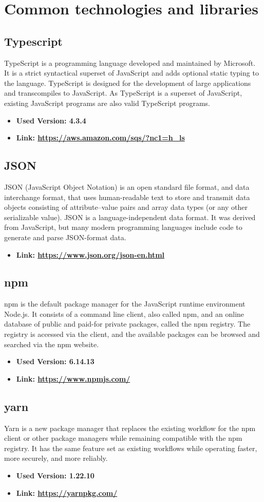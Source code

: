 \section{Common technologies and libraries}
\subsection{Typescript}
TypeScript is a programming language developed and maintained by Microsoft. It is a strict syntactical
superset of JavaScript and adds optional static typing to the language. TypeScript is designed for the
development of large applications and transcompiles to JavaScript. As TypeScript is a superset of JavaScript,
existing JavaScript programs are also valid TypeScript programs.
\begin{itemize}
  \item \textbf{Used Version: 4.3.4}
  \item \textbf{Link: \url{https://aws.amazon.com/sqs/?nc1=h_ls}}
\end{itemize}
\subsection{JSON}
JSON (JavaScript Object Notation) is an open standard file format, and data interchange format, that
uses human-readable text to store and transmit data objects consisting of attribute–value pairs and
array data types (or any other serializable value).
JSON is a language-independent data format. It was derived from JavaScript,
but many modern programming languages include code to generate and parse JSON-format data.
\begin{itemize}
  \item \textbf{Link: \url{https://www.json.org/json-en.html}}
\end{itemize}
\subsection{npm}
npm is the default package manager for the JavaScript runtime environment Node.js.
It consists of a command line client, also called npm, and an online database of public and paid-for private packages,
called the npm registry. The registry is accessed via the client, and the available packages can be browsed and
searched via the npm website.
\begin{itemize}
  \item \textbf{Used Version: 6.14.13}
  \item \textbf{Link: \url{https://www.npmjs.com/}}
\end{itemize}
\subsection{yarn}
Yarn is a new package manager that replaces the existing workflow for the npm client or other package managers while
remaining compatible with the npm registry. It has the same feature set as existing workflows while operating faster,
more securely, and more reliably.
\begin{itemize}
  \item \textbf{Used Version: 1.22.10}
  \item \textbf{Link: \url{https://yarnpkg.com/}}
\end{itemize}